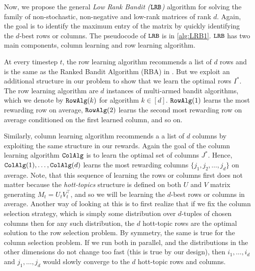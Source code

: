 
Now, we propose the general \emph{Low Rank Bandit (${\tt LRB}$)} algorithm for solving the family of non-stochastic, non-negative and low-rank matrices of rank $d$. Again, the goal is to identify the maximum entry of the matrix by quickly identifying the $d$-best rows or columns. The pseudocode of ${\tt LRB}$ is in \cref{alg:LRB1}. ${\tt LRB}$ has two main components, column learning and row learning algorithm. 

At every timestep $t$, the row learning algorithm recommends a list of $d$ rows and is the same as the Ranked Bandit Algorithm (RBA) in \citet{radlinski2008learning}. But we exploit an additional structure in our problem to show that we learn the optimal rows $I^\ast$. The row learning algorithm are $d$ instances of multi-armed bandit algorithms, which we denote by ${\tt RowAlg}(k)$ for algorithm $k \in [d]$. ${\tt RowAlg}(1)$ learns the most rewarding row on average, ${\tt RowAlg}(2)$ learns the second most rewarding row on average conditioned on the first learned column, and so on.


Similarly, column learning algorithm recommends a a list of $d$ columns by exploiting the same structure in our rewards. Again the goal of the column learning algorithm ${\tt ColAlg}$ is to learn the optimal set of columns $J^\ast$. Hence, ${\tt ColAlg}(1),\dots,{\tt ColAlg}(d)$ learns the most rewarding columns $\lbrace j_1,j_2,\dots,j_d \rbrace$ on average. Note, that this sequence of learning the rows or columns first does not matter because the \emph{hott-topics} structure is defined on both $U$ and $V$ matrix generating $M_t = U_t V_t^\intercal$, and so we will be learning the $d$-best rows or columns in average. Another way of looking at this is to first realize that if we fix the column selection strategy, which is simply some distribution over $d$-tuples of chosen columns then for any such distribution, the $d$ hott-topic rows are the optimal solution to the row selection problem. By symmetry, the same is true for the column selection problem. If we run both in parallel, and the distributions in the other dimensions do not change too fast (this is true by our design), then $i_1, \dots, i_d$ and $j_1, \dots, j_d$ would slowly converge to the $d$ hott-topic rows and columns.




